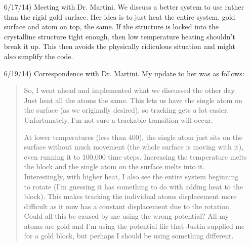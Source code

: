\documentclass[12pt]{article}
\begin{document}
\begin{itemize}
\begin{quote}
Running the model with spatial parallelization is pretty simple, I just pass it to mpi and tell it how many cores to run it on and lammps does the spatial decomposition (is this correct?).  Doing this on my home machine, I see a very nice speed increase (which has 4 cores).  I'll be tweaking my input script and running it on the cluster today to see how things scale.

Next, I'll be working on the replicas.  I was reading the manual last night and it seems very straightforward, but I'll ask Justin if I run into any problems.
\end{quote}

Later that day, I wrote a bash script which manually pulls out the relevant data from the lammps dump file so that plots can be made.  Using this, I was able to create the graph in Figure~\ref{msd_rand}.

\begin{figure}
\begin{center}
 \texttt{[image: figures/single\_atom\_msd]}
 \caption{The squared displacement of a single atom being heated to roughly 1,000K while gold block surface is kept perfectly rigid.  Note: this is physically ridiculous.}
 \label{msd_rand}
 \end{center}
\end{figure}


\item[6/17/14)] Meeting with Dr. Martini.  We discuss a better system to use rather than the rigid gold surface.  Her idea is to just heat the entire system, gold surface and atom on top, the same.  If the structure is locked into the crystalline structure tight enough, then low temperature heating shouldn't break it up.  This then avoids the physically ridiculous situation and might also simplify the code.

\item[6/19/14)] Correspondence with Dr. Martini.  My update to her was as follows:

\begin{quote}
 So, I went ahead and implemented what we discussed the other day.  Just heat all the atoms the same.  This lets us have the single atom on the surface (as we originally desired), so tracking gets a lot easier.  Unfortunately, I'm not sure a trackable transition will occur.  

At lower temperatures (less than 400), the single atom just sits on the surface without much movement (the whole surface is moving with it), even running it to 100,000 time steps.  Increasing the temperature melts the block and the single atom on the surface melts into it.  Interestingly, with higher heat, I also see the entire system beginning to rotate (I'm guessing it has something to do with adding heat to the block).  This makes tracking the individual atoms displacement more difficult as it now has a constant displacement due to the rotation.  Could all this be caused by me using the wrong potential?  All my atoms are gold and I'm using the potential file that Justin supplied me for a gold block, but perhaps I should be using something different.


\end{quote}
\end{itemize}
\end{document}
